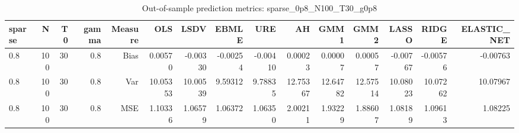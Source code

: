 \begin{table}[!htbp]\centering
\caption{Out-of-sample prediction metrics: sparse_0p8_N100_T30_g0p8}
\label{tab:table3_sparse_0p8_N100_T30_g0p8}
\begin{tabular}{lrrrrrrrrrrrrrr}
\hline
sparse & N & T0 & gamma & Measure & OLS & LSDV & EBMLE & URE & AH & GMM1 & GMM2 & LASSO & RIDGE & ELASTIC_NET \\
\hline
0.8 & 100 & 30 & 0.8 & Bias & 0.00570 & -0.00330 & -0.00254 & -0.00410 & 0.00023 & 0.00007 & 0.00057 & -0.00767 & -0.00576 & -0.00763 \\
0.8 & 100 & 30 & 0.8 & Var & 10.05353 & 10.00539 & 9.59312 & 9.78835 & 12.75367 & 12.64782 & 12.57514 & 10.08023 & 10.07262 & 10.07967 \\
0.8 & 100 & 30 & 0.8 & MSE & 1.10336 & 1.06579 & 1.06372 & 1.06350 & 2.00211 & 1.93229 & 1.88607 & 1.08189 & 1.09613 & 1.08225 \\
\hline
\end{tabular}
\end{table}

